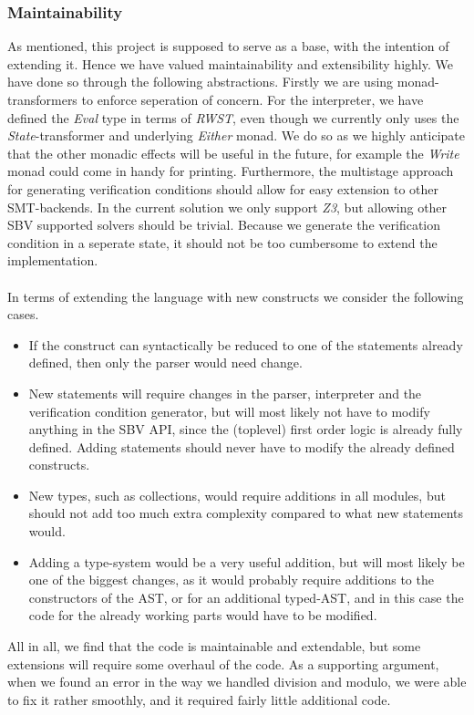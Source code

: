 \subsubsection{Maintainability}
As mentioned, this project is supposed to serve as a base, with the intention of extending it.
Hence we have valued maintainability and extensibility highly.
We have done so through the following abstractions.
Firstly we are using monad-transformers to enforce seperation of concern.
For the interpreter, we have defined the \textit{Eval} type in terms of \textit{RWST}, even though we currently only uses the \textit{State}-transformer and underlying \textit{Either} monad.
We do so as we highly anticipate that the other monadic effects will be useful in the future, for example the \textit{Write} monad could come in handy for printing.
Furthermore, the multistage approach for generating verification conditions should allow for easy extension to other SMT-backends.
In the current solution we only support \textit{Z3}, but allowing other SBV supported solvers should be trivial.
Because we generate the verification condition in a seperate state, it should not be too cumbersome to extend the implementation.
\\~\\
In terms of extending the language with new constructs we consider the following cases.
\begin{itemize}
  \item If the construct can syntactically be reduced to one of the statements already defined, then only the parser would need change.
  \item New statements will require changes in the parser, interpreter and the verification condition generator, but will most likely not have to modify anything in the SBV API, since the (toplevel) first order logic is already fully defined.
  Adding statements should never have to modify the already defined constructs.
  \item New types, such as collections, would require additions in all modules, but should not add too much extra complexity compared to what new statements would.
  \item Adding a type-system would be a very useful addition, but will most likely be one of the biggest changes, as it would probably require additions to the constructors of the AST, or for an additional typed-AST, and in this case the code for the already working parts would have to be modified.
\end{itemize}
All in all, we find that the code is maintainable and extendable, but some extensions will require some overhaul of the code. 
As a supporting argument, when we found an error in the way we handled division and modulo, we were able to fix it rather smoothly, and it required fairly little additional code.


